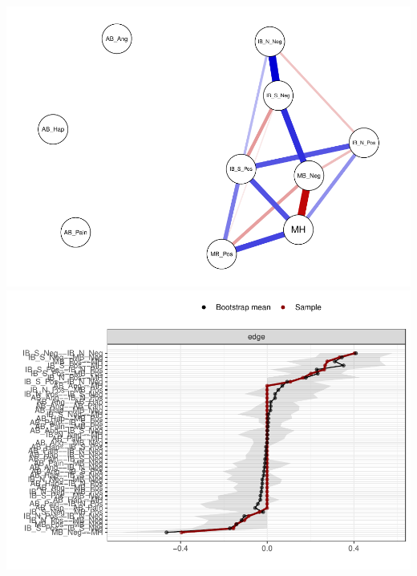\documentclass[man,floatsintext]{apa6}
\begin{document}
\includegraphics{script_files/figure-latex/stability-1.pdf}
\includegraphics{script_files/figure-latex/stability-2.pdf}
\end{document}
